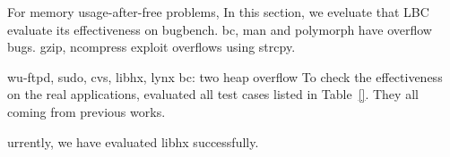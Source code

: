 For memory usage-after-free problems, 
In this section, we eveluate that 
LBC evaluate its effectiveness on bugbench.
bc, man and polymorph have overflow bugs.
gzip, ncompress exploit overflows using strcpy. 


wu-ftpd, sudo, cvs, libhx, lynx
bc: two heap overflow
To check the effectiveness on the real applications, \doubletake{} evaluated all test cases listed in Table~\ref{}. They all coming from previous works. 


urrently, we have evaluated libhx successfully.

